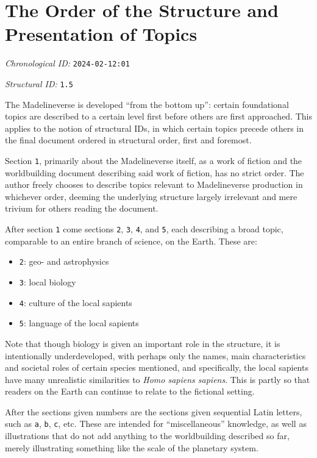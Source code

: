 \section{The Order of the Structure and Presentation of Topics}
\emph{Chronological ID:} \texttt{2024-02-12:01}

\emph{Structural ID:} \texttt{1.5}

The Madelineverse is developed ``from the bottom up'': certain foundational topics are described to a certain level first before others are first approached. This applies to the notion of structural IDs, in which certain topics precede others in the final document ordered in structural order, first and foremost.

Section \texttt{1}, primarily about the Madelineverse itself, as a work of fiction and the worldbuilding document describing said work of fiction, has no strict order. The author freely chooses to describe topics relevant to Madelineverse production in whichever order, deeming the underlying structure largely irrelevant and mere trivium for others reading the document.

After section \texttt{1} come sections \texttt{2}, \texttt{3}, \texttt{4}, and \texttt{5}, each describing a broad topic, comparable to an entire branch of science, on the Earth. These are:

\begin{itemize}
  \item \texttt{2}: geo- and astrophysics
  \item \texttt{3}: local biology
  \item \texttt{4}: culture of the local sapients
  \item \texttt{5}: language of the local sapients
\end{itemize}

Note that though biology is given an important role in the structure, it is intentionally underdeveloped, with perhaps only the names, main characteristics and societal roles of certain species mentioned, and specifically, the local sapients have many unrealistic similarities to \emph{Homo sapiens sapiens}. This is partly so that readers on the Earth can continue to relate to the fictional setting.

After the sections given numbers are the sections given sequential Latin letters, such as \texttt{a}, \texttt{b}, \texttt{c}, etc. These are intended for ``miscellaneous'' knowledge, as well as illustrations that do not add anything to the worldbuilding described so far, merely illustrating something like the scale of the planetary system.
\newpage
